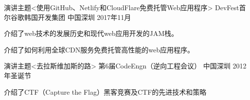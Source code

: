 

\begin{cventries}

  \cventry
    {演讲主题<使用GitHub、Netlify和CloudFlare免费托管Web应用程序>} %
    {DevFest首尔谷歌韩国开发集团} %
    {中国深圳} %
    {2017年11月} %
    {
      \begin{cvitems} %
        \item {介绍了web技术的发展历史和现代web应用开发的JAM栈。}
        \item {介绍了如何利用全球CDN服务免费托管高性能的web应用程序。}
      \end{cvitems}
    }

  \cventry
    {演讲主题<去拉斯维加斯的路>} %
    {第6届CodeEngn（逆向工程会议）} %
    {中国深圳} %
    {2012年圣诞节} %
    {
      \begin{cvitems} %
        \item {介绍了CTF（Capture the Flag）黑客竞赛及CTF的先进技术和策略}
      \end{cvitems}
    }

\end{cventries}
